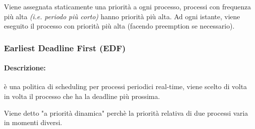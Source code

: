 Viene assegnata staticamente una priorità a ogni processo, processi con frequenza più alta \textit{(i.e. periodo più corto)} hanno priorità più alta. Ad ogni istante, viene eseguito il processo con priorità più alta (facendo preemption se necessario).

\subsubsection{Earliest Deadline First (EDF)}
\paragraph{Descrizione:} è una politica di scheduling per processi periodici real-time, viene scelto di volta in volta il processo che ha la deadline più prossima. 

Viene detto "a priorità dinamica" perchè la priorità relativa di due processi varia in momenti diversi.

